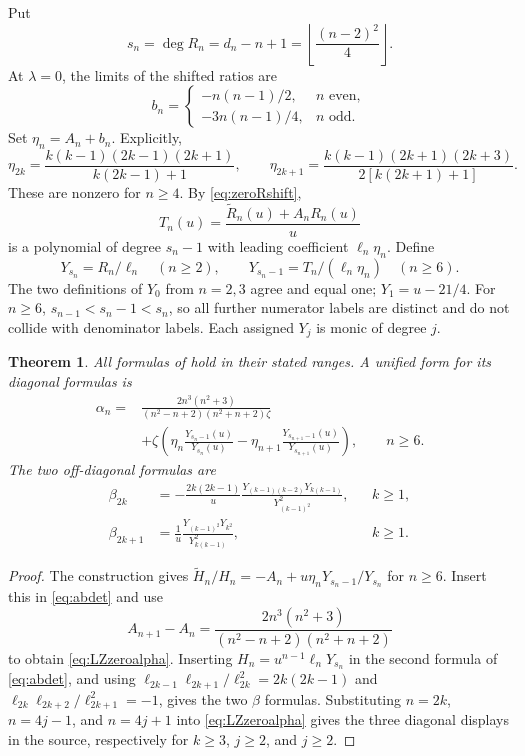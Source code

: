 \documentclass[11pt]{article}
\numberwithin{equation}{section}
\newtheorem{theorem}{Theorem}[section]
\theoremstyle{remark}
\newcommand{\wt}{\widetilde}
\begin{document}
Put
\begin{equation}\label{eq:sndef}
 s_n=\deg R_n=d_n-n+1=
                  \left\lfloor\frac{(n-2)^2}{4}\right\rfloor.
\end{equation}
At $\lambda=0$, the limits of the shifted ratios are
\[
 b_n=\begin{cases}
       -n(n-1)/2,&n\text{ even},\\
       -3n(n-1)/4,&n\text{ odd}.
      \end{cases}
\]
Set $\eta_n=A_n+b_n$. Explicitly,
\begin{equation}\label{eq:eta}
 \eta_{2k}=\frac{k(k-1)(2k-1)(2k+1)}{k(2k-1)+1},\qquad
 \eta_{2k+1}=\frac{k(k-1)(2k+1)(2k+3)}{2[k(2k+1)+1]}.
\end{equation}
These are nonzero for $n\ge4$. By \eqref{eq:zeroRshift},
\[
 T_n(u)=\frac{\wt R_n(u)+A_nR_n(u)}u
\]
is a polynomial of degree $s_n-1$ with leading coefficient
$\ell_n\eta_n$. Define
\[
 Y_{s_n}=R_n/\ell_n\quad(n\ge2),\qquad
 Y_{s_n-1}=T_n/(\ell_n\eta_n)\quad(n\ge6).
\]
The two definitions of $Y_0$ from $n=2,3$ agree and equal one;
$Y_1=u-21/4$. For $n\ge6$,
$s_{n-1}<s_n-1<s_n$, so all further numerator labels are distinct
and do not collide with denominator labels. Each assigned $Y_j$ is
monic of degree $j$.

\begin{theorem}\label{thm:LZ27}
All formulas of \cite[Conjecture~2.7]{LyuZhou2026} hold in their
stated ranges. A unified form for its diagonal formulas is
\begin{equation}\label{eq:LZzeroalpha}
 \begin{split}
 \alpha_n={}&
 \frac{2n^3(n^2+3)}{(n^2-n+2)(n^2+n+2)\zeta}\\
 &+\zeta\left(
 \eta_n\frac{Y_{s_n-1}(u)}{Y_{s_n}(u)}
 -\eta_{n+1}\frac{Y_{s_{n+1}-1}(u)}{Y_{s_{n+1}}(u)}\right),
 \qquad n\ge6.
 \end{split}
\end{equation}
The two off-diagonal formulas are
\begin{align}
 \beta_{2k}&=-\frac{2k(2k-1)}u
 \frac{Y_{(k-1)(k-2)}Y_{k(k-1)}}{Y_{(k-1)^2}^2},&&k\ge1,
 \label{eq:LZzerobeven}\\
 \beta_{2k+1}&=\frac1u
 \frac{Y_{(k-1)^2}Y_{k^2}}{Y_{k(k-1)}^2},&&k\ge1.
 \label{eq:LZzerobodd}
\end{align}
\end{theorem}

\begin{proof}
The construction gives
$\wt H_n/H_n=-A_n+u\eta_nY_{s_n-1}/Y_{s_n}$ for $n\ge6$.
Insert this in \eqref{eq:abdet} and use
\[
 A_{n+1}-A_n=\frac{2n^3(n^2+3)}{(n^2-n+2)(n^2+n+2)}
\]
to obtain \eqref{eq:LZzeroalpha}. Inserting
$H_n=u^{n-1}\ell_nY_{s_n}$ in the second formula of
\eqref{eq:abdet}, and using
$\ell_{2k-1}\ell_{2k+1}/\ell_{2k}^2=2k(2k-1)$ and
$\ell_{2k}\ell_{2k+2}/\ell_{2k+1}^2=-1$, gives the two $\beta$
formulas. Substituting $n=2k$, $n=4j-1$, and $n=4j+1$ into
\eqref{eq:LZzeroalpha} gives the three diagonal displays in the
source, respectively for $k\ge3$, $j\ge2$, and $j\ge2$.
\end{proof}
\end{document}
